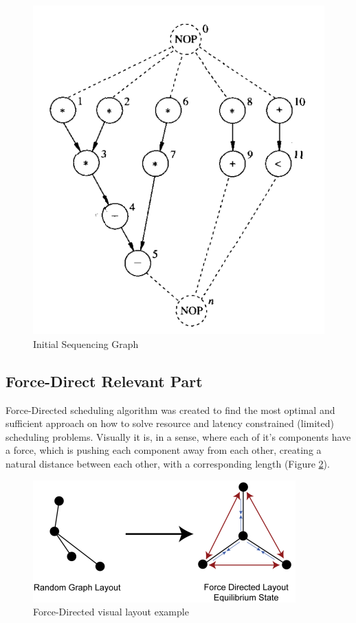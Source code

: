 \documentclass[conference]{IEEEtran}
\begin{document}
\begin{figure}[htbp]
\centerline{\includegraphics[scale=.5]{Sequencing_Graph.png}}
\caption{Initial Sequencing Graph}
\label{sequence}
\end{figure}

\subsection{Force-Direct Relevant Part}
Force-Directed scheduling algorithm was created to find the most optimal and sufficient approach on how to solve resource and latency constrained (limited) scheduling problems. Visually it is, in a sense, where each of it's components have a force, which is pushing each component away from each other, creating a natural distance between each other, with a corresponding length (Figure \ref{fdlayout}).

\begin{figure}[htbp]
\centerline{\includegraphics[scale=.5]{force_directed_layout_example.png}}
\caption{Force-Directed visual layout example}
\label{fdlayout}
\end{figure}
\end{document}
